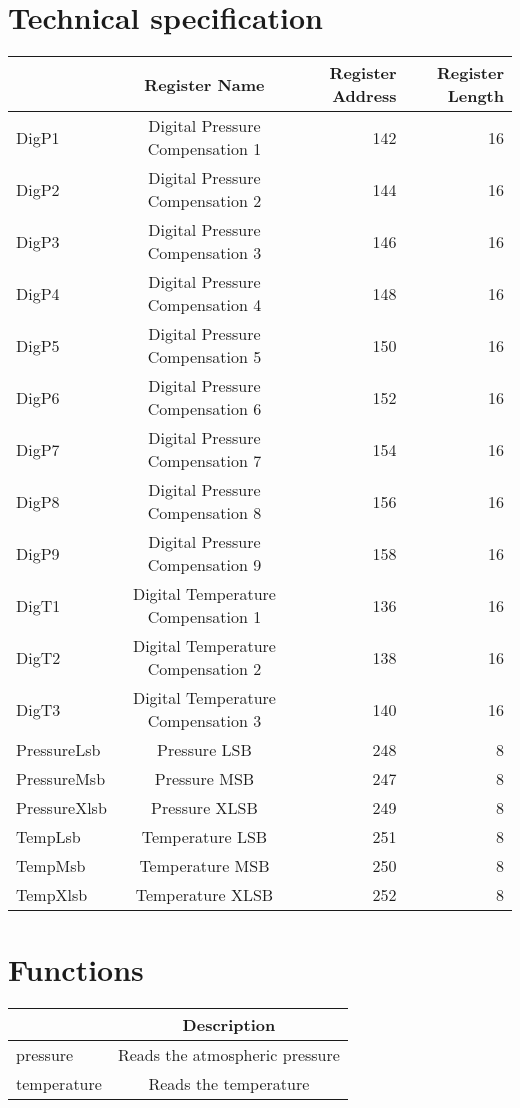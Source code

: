 \documentclass[a4paper,12pt,oneside,pdflatex,italian,final,twocolumn]{article}
\begin{document}
\section{Technical specification}
\centering
\begin{tabular}{lcrr}
\toprule
 & Register Name & Register Address & Register Length \\
\midrule
DigP1 & Digital Pressure Compensation 1 & 142 & 16 \\
DigP2 & Digital Pressure Compensation 2 & 144 & 16 \\
DigP3 & Digital Pressure Compensation 3 & 146 & 16 \\
DigP4 & Digital Pressure Compensation 4 & 148 & 16 \\
DigP5 & Digital Pressure Compensation 5 & 150 & 16 \\
DigP6 & Digital Pressure Compensation 6 & 152 & 16 \\
DigP7 & Digital Pressure Compensation 7 & 154 & 16 \\
DigP8 & Digital Pressure Compensation 8 & 156 & 16 \\
DigP9 & Digital Pressure Compensation 9 & 158 & 16 \\
DigT1 & Digital Temperature Compensation 1 & 136 & 16 \\
DigT2 & Digital Temperature Compensation 2 & 138 & 16 \\
DigT3 & Digital Temperature Compensation 3 & 140 & 16 \\
PressureLsb & Pressure LSB & 248 & 8 \\
PressureMsb & Pressure MSB & 247 & 8 \\
PressureXlsb & Pressure XLSB & 249 & 8 \\
TempLsb & Temperature LSB & 251 & 8 \\
TempMsb & Temperature MSB & 250 & 8 \\
TempXlsb & Temperature XLSB & 252 & 8 \\
\bottomrule
\end{tabular}


\raggedright

\section{Functions}

\centering
\begin{tabular}{lc}
\toprule
  & Description \\
\midrule
pressure & Reads the atmospheric pressure \\
temperature & Reads the temperature \\
\bottomrule
\end{tabular}
\end{document}

